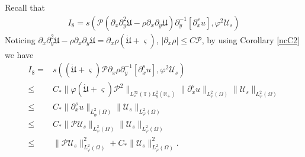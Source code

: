 \documentclass{amsart}
\numberwithin{equation}{section}
\begin{document}
Recall that
\begin{align*}
I_{8}
=s\left(\mathcal{P}\left(\partial_{x}\partial_{y}^{2}\mathfrak{U}-\rho\partial_{x}\partial_{y}\mathfrak{U}\right)\partial_{y}^{-1}[\partial_{x}^{s}u],\varphi^{2}\mathcal{U}_{s}\right)
\end{align*}
Noticing $\partial_{x}\partial_{y}^{2}\mathfrak{U}-\rho\partial_{x}\partial_{y}\mathfrak{U}=\partial_{x}\rho(\dot{\mathfrak{U}}+\varsigma)$,
$|\partial_{x}\rho|\leq C\mathcal{P}$,
by using Corollary \ref{ncC2} we have
\begin{align*}
I_{8}
=&s\left((\dot{\mathfrak{U}}+\varsigma)\mathcal{P}\partial_{x}\rho\partial_{y}^{-1}[\partial_{x}^{s}u],\varphi^{2}\mathcal{U}_{s}\right)\\
\leq& C_{*}\|\varphi(\dot{\mathfrak{U}}+\varsigma)\mathcal{P}^{2}\|_{L_{x}^{\infty}(\mathbb{T})L_{y}^{2}(\mathbb{R_{+}})}
       \|\partial_{x}^{s}u\|_{L_{\varphi}^{2}(\Omega)}\|\mathcal{U}_{s}\|_{L_{\varphi}^{2}(\Omega)}\\
\leq& C_{*}\|\partial_{x}^{s}u\|_{L_{\hat{\Psi}}^{2}(\Omega)}\|\mathcal{U}_{s}\|_{L_{\varphi}^{2}(\Omega)}\\
\leq& C_{*}\|\mathcal{P}\mathcal{U}_{s}\|_{L_{\varphi}^{2}(\Omega)}\|\mathcal{U}_{s}\|_{L_{\varphi}^{2}(\Omega)}\\
\leq& \|\mathcal{P}\mathcal{U}_{s}\|_{L_{\varphi}^{2}(\Omega)}^{2}
     +C_{*}\|\mathcal{U}_{s}\|_{L_{\varphi}^{2}(\Omega)}^{2}.
\end{align*}
\end{document}
